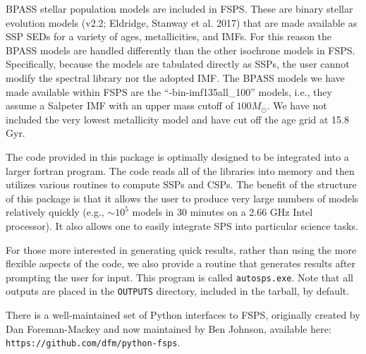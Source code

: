 \documentclass[]{article}
\newcommand{\Msun}{M_{\odot}}
\begin{document}
\vspace{0.1in}
\vspace{0.1in}

\noindent
BPASS stellar population models are included in FSPS.  These are binary stellar
evolution models (v2.2; Eldridge, Stanway et al. 2017) that are made available
as SSP SEDs for a variety of ages, metallicities, and IMFs.  For this reason the
BPASS models are handled differently than the other isochrone models in FSPS.
Specifically, because the models are tabulated directly as SSPs, the user cannot
modify the spectral library nor the adopted IMF.  The BPASS models we have made
available within FSPS are the ``-bin-imf135all\_100'' models, i.e., they assume
a Salpeter IMF with an upper mass cutoff of $100\Msun$.  We have not included
the very lowest metallicity model and have cut off the age grid at 15.8 Gyr.


\vspace{0.2in}
\vspace{0.1in}

\noindent
The code provided in this package is optimally designed to be integrated into a
larger fortran program.  The code reads all of the libraries into memory and
then utilizes various routines to compute SSPs and CSPs.  The benefit of the
structure of this package is that it allows the user to produce very large
numbers of models relatively quickly (e.g., $\sim10^5$ models in 30 minutes on a
2.66 GHz Intel processor).  It also allows one to easily integrate SPS into
particular science tasks.

For those more interested in generating quick results, rather than using the
more flexible aspects of the code, we also provide a routine that generates
results after prompting the user for input.  This program is called
\texttt{autosps.exe}.  Note that all outputs are placed in the \texttt{OUTPUTS}
directory, included in the tarball, by default.

There is a well-maintained set of Python interfaces to FSPS, originally created
by Dan Foreman-Mackey and now maintained by Ben Johnson, available here:
\texttt{https://github.com/dfm/python-fsps}.


\vspace{0.4in}
\vspace{0.1in}

\vspace{0.1in}
\end{document}
